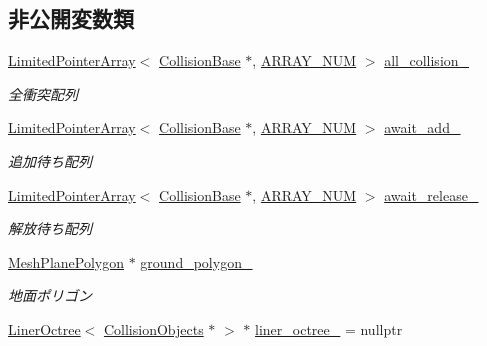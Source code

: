 \subsection*{非公開変数類}
\begin{DoxyCompactItemize}
\item 
\mbox{\hyperlink{class_limited_pointer_array}{Limited\+Pointer\+Array}}$<$ \mbox{\hyperlink{class_collision_base}{Collision\+Base}} $\ast$, \mbox{\hyperlink{class_collision_manager_addbc64e1fa0b01f3be07c897887f44ec}{A\+R\+R\+A\+Y\+\_\+\+N\+UM}} $>$ \mbox{\hyperlink{class_collision_manager_a1be7aa8904688724543897d58b22a406}{all\+\_\+collision\+\_\+}}
\begin{DoxyCompactList}\small\item\em 全衝突配列 \end{DoxyCompactList}\item 
\mbox{\hyperlink{class_limited_pointer_array}{Limited\+Pointer\+Array}}$<$ \mbox{\hyperlink{class_collision_base}{Collision\+Base}} $\ast$, \mbox{\hyperlink{class_collision_manager_addbc64e1fa0b01f3be07c897887f44ec}{A\+R\+R\+A\+Y\+\_\+\+N\+UM}} $>$ \mbox{\hyperlink{class_collision_manager_aca55a8f7b3f67f58b5455cf1ac17fc8b}{await\+\_\+add\+\_\+}}
\begin{DoxyCompactList}\small\item\em 追加待ち配列 \end{DoxyCompactList}\item 
\mbox{\hyperlink{class_limited_pointer_array}{Limited\+Pointer\+Array}}$<$ \mbox{\hyperlink{class_collision_base}{Collision\+Base}} $\ast$, \mbox{\hyperlink{class_collision_manager_addbc64e1fa0b01f3be07c897887f44ec}{A\+R\+R\+A\+Y\+\_\+\+N\+UM}} $>$ \mbox{\hyperlink{class_collision_manager_a077c3b33557c56afef69c69698fc76e0}{await\+\_\+release\+\_\+}}
\begin{DoxyCompactList}\small\item\em 解放待ち配列 \end{DoxyCompactList}\item 
\mbox{\hyperlink{class_mesh_plane_polygon}{Mesh\+Plane\+Polygon}} $\ast$ \mbox{\hyperlink{class_collision_manager_ab080264a45322bec38189279428d44cb}{ground\+\_\+polygon\+\_\+}}
\begin{DoxyCompactList}\small\item\em 地面ポリゴン \end{DoxyCompactList}\item 
\mbox{\hyperlink{class_liner_octree}{Liner\+Octree}}$<$ \mbox{\hyperlink{class_collision_objects}{Collision\+Objects}} $\ast$ $>$ $\ast$ \mbox{\hyperlink{class_collision_manager_aa7e8919f4e8af9764106a26a0cfcf6a7}{liner\+\_\+octree\+\_\+}} = nullptr

\end{DoxyCompactItemize}
